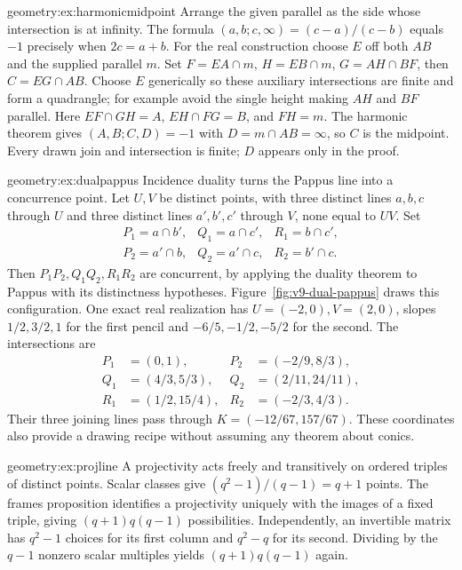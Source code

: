 \begin{solution}{geometry:ex:harmonicmidpoint}
\idea Arrange the given parallel as the side whose intersection is at infinity.
\writeup The formula $(a,b;c,\infty)=(c-a)/(c-b)$ equals $-1$ precisely when $2c=a+b$. For the real construction choose $E$ off both $AB$ and the supplied parallel $m$. Set $F=EA\cap m$, $H=EB\cap m$, $G=AH\cap BF$, then $C=EG\cap AB$. Choose $E$ generically so these auxiliary intersections are finite and form a quadrangle; for example avoid the single height making $AH$ and $BF$ parallel. Here $EF\cap GH=A$, $EH\cap FG=B$, and $FH=m$. The harmonic theorem gives $(A,B;C,D)=-1$ with $D=m\cap AB=\infty$, so $C$ is the midpoint. Every drawn join and intersection is finite; $D$ appears only in the proof.
\end{solution}
\begin{solution}{geometry:ex:dualpappus}
\idea Incidence duality turns the Pappus line into a concurrence point.
\writeup Let $U,V$ be distinct points, with three distinct lines $a,b,c$ through $U$ and three distinct lines $a',b',c'$ through $V$, none equal to $UV$. Set
\[
\begin{array}{lll}
P_1=a\cap b',&Q_1=a\cap c',&R_1=b\cap c',\\
P_2=a'\cap b,&Q_2=a'\cap c,&R_2=b'\cap c.
\end{array}
\]
Then $P_1P_2,Q_1Q_2,R_1R_2$ are concurrent, by applying the duality theorem to Pappus with its distinctness hypotheses. Figure~\ref{fig:v9-dual-pappus} draws this configuration. One exact real realization has $U=(-2,0),V=(2,0)$, slopes $1/2,3/2,1$ for the first pencil and $-6/5,-1/2,-5/2$ for the second. The intersections are
\[
\begin{aligned}
P_1&=(0,1),&P_2&=(-2/9,8/3),\\
Q_1&=(4/3,5/3),&Q_2&=(2/11,24/11),\\
R_1&=(1/2,15/4),&R_2&=(-2/3,4/3).
\end{aligned}
\]
Their three joining lines pass through $K=(-12/67,157/67)$. These coordinates also provide a drawing recipe without assuming any theorem about conics.
\end{solution}
\begin{solution}{geometry:ex:projline}
\idea A projectivity acts freely and transitively on ordered triples of distinct points.
\writeup Scalar classes give $(q^2-1)/(q-1)=q+1$ points. The frames proposition identifies a projectivity uniquely with the images of a fixed triple, giving $(q+1)q(q-1)$ possibilities. Independently, an invertible matrix has $q^2-1$ choices for its first column and $q^2-q$ for its second. Dividing by the $q-1$ nonzero scalar multiples yields $(q+1)q(q-1)$ again.
\end{solution}
